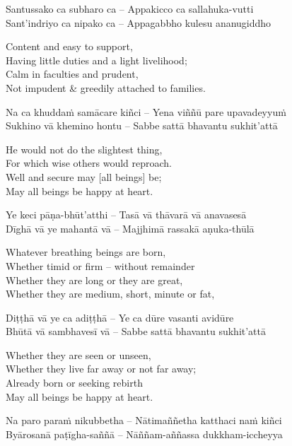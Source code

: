 Santussako ca subharo ca – Appakicco ca sallahuka-vutti\\
Sant'indriyo ca nipako ca – Appagabbho kulesu ananugiddho

\begin{english}
  Content and easy to support,\\
  Having little duties and a light livelihood;\\
  Calm in faculties and prudent,\\
  Not impudent \& greedily attached to families.
\end{english}

Na ca khuddaṁ samācare kiñci – Yena viññū pare upavadeyyuṁ\\
Sukhino vā khemino hontu – Sabbe sattā bhavantu sukhit'attā

\begin{english}
  He would not do the slightest thing,\\
  For which wise others would reproach.\\
  Well and secure may [all beings] be;\\
  May all beings be happy at heart.
\end{english}

Ye keci pāṇa-bhūt'atthi – Tasā vā thāvarā vā anavasesā\\
Dīghā vā ye mahantā vā – Majjhimā rassakā aṇuka-thūlā

\begin{english}
  Whatever breathing beings are born,\\
  Whether timid or firm – without remainder\\
  Whether they are long or they are great,\\
  Whether they are medium, short, minute or fat,
\end{english}

Diṭṭhā vā ye ca adiṭṭhā – Ye ca dūre vasanti avidūre\\
Bhūtā vā sambhavesī vā – Sabbe sattā bhavantu sukhit'attā

\begin{english}
  Whether they are seen or unseen,\\
  Whether they live far away or not far away;\\
  Already born or seeking rebirth\\
  May all beings be happy at heart.
\end{english}

Na paro paraṁ nikubbetha – Nātimaññetha katthaci naṁ kiñci\\
Byārosanā paṭīgha-saññā – Nāññam-aññassa dukkham-iccheyya

